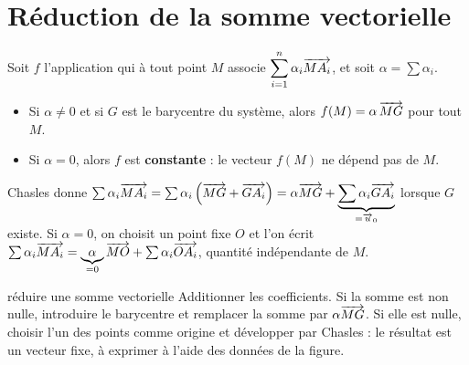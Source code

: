 \section{Réduction de la somme vectorielle}

\begin{theoreme}
Soit $f$ l'application qui à tout point $M$ associe
$\displaystyle\sum_{i=1}^{n}\alpha_{i}\overrightarrow{MA_{i}}$, et soit
$\alpha = \sum \alpha_{i}$.
\begin{itemize}[leftmargin=*, itemsep=0.1em]
  \item Si $\alpha \neq 0$ et si $G$ est le barycentre du système, alors
        $f(M) = \alpha\,\overrightarrow{MG}$ pour tout $M$.
  \item Si $\alpha = 0$, alors $f$ est \textbf{constante} : le vecteur
        $f(M)$ ne dépend pas de $M$.
\end{itemize}
\end{theoreme}

\begin{demonstration}
Chasles donne $\sum \alpha_{i}\overrightarrow{MA_{i}}
= \sum \alpha_{i}\left(\overrightarrow{MG}+\overrightarrow{GA_{i}}\right)
= \alpha\overrightarrow{MG}+\underbrace{\sum \alpha_{i}\overrightarrow{GA_{i}}}_{= \overrightarrow{u}_{0}}$
lorsque $G$ existe. Si $\alpha = 0$, on choisit un point fixe $O$ et l'on
écrit $\sum \alpha_{i}\overrightarrow{MA_{i}}
= \underbrace{\alpha}_{=0}\overrightarrow{MO}+\sum \alpha_{i}\overrightarrow{OA_{i}}$, quantité
indépendante de $M$.
\end{demonstration}

\begin{methode}{réduire une somme vectorielle}
Additionner les coefficients. Si la somme est non nulle, introduire le
barycentre et remplacer la somme par $\alpha\overrightarrow{MG}$. Si elle est nulle,
choisir l'un des points comme origine et développer par Chasles : le résultat
est un vecteur fixe, à exprimer à l'aide des données de la figure.
\end{methode}

